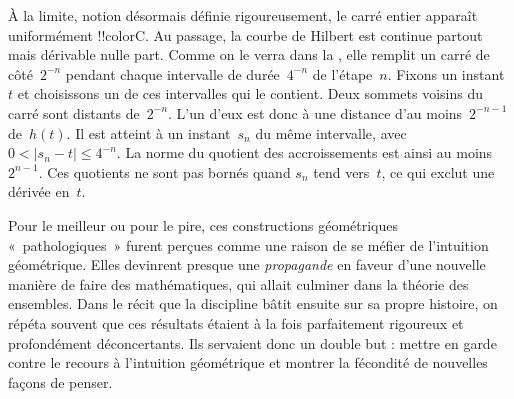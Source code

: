 \documentclass[../../../include/open-logic-section]{subfiles}
\begin{document}
À la limite, notion désormais définie rigoureusement, le carré
entier apparaît uniformément !!{colorC}. Au passage, la courbe de
Hilbert est continue partout mais dérivable nulle part. Comme on le
verra dans la , elle remplit un carré
de côté~$2^{-n}$ pendant chaque intervalle de durée~$4^{-n}$ de
l'étape~$n$. Fixons un instant~$t$ et choisissons un de ces intervalles
qui le contient. Deux sommets voisins du carré sont distants
de~$2^{-n}$. L'un d'eux est donc à une distance d'au moins~$2^{-n-1}$
de~$h(t)$. Il est atteint à un instant~$s_n$ du même intervalle, avec
$0<|s_n-t|\leq 4^{-n}$. La norme du quotient des accroissements est
ainsi au moins~$2^{n-1}$. Ces quotients ne sont pas bornés quand
$s_n$ tend vers~$t$, ce qui exclut une dérivée en~$t$.

Pour le meilleur ou pour le pire, ces constructions géométriques
«~pathologiques~» furent perçues comme une raison de se méfier de
l'intuition géométrique. Elles devinrent presque une
\emph{propagande} en faveur d'une nouvelle manière de faire des
mathématiques, qui allait culminer dans la théorie des ensembles.
Dans le récit que la discipline bâtit ensuite sur sa propre histoire,
on répéta souvent que ces résultats étaient à la fois parfaitement
rigoureux et profondément déconcertants. Ils servaient donc un double
but : mettre en garde contre le recours à l'intuition géométrique
et montrer la fécondité de nouvelles façons de penser.
\end{document}
